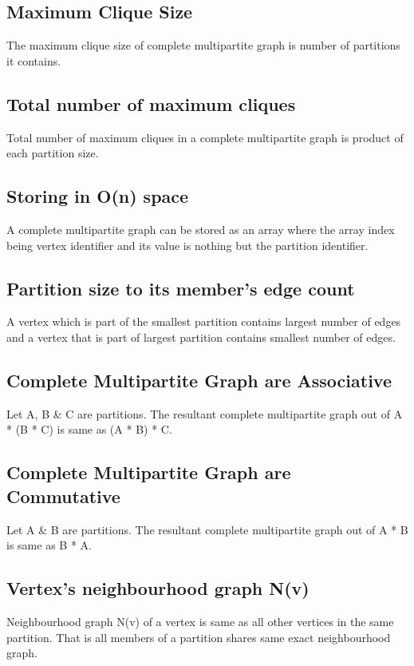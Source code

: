 \documentclass[12pt]{article}
\theoremstyle{plain}
\theoremstyle{definition}
\begin{document}
\subsection{Maximum Clique Size}
The maximum clique size of complete multipartite graph is number of partitions it contains.

\subsection{Total number of maximum cliques}
Total number of maximum cliques in a complete multipartite graph is product of each partition size.

\subsection{Storing in O(n) space}

A complete multipartite graph can be stored as an array where the array index being vertex identifier and its value is nothing but the partition identifier.

\subsection{Partition size to its member's edge count}

A vertex which is part of the smallest partition contains largest number of edges and a vertex that is part of largest partition contains smallest number of edges.


\subsection{Complete Multipartite Graph are Associative}
Let A, B \& C are partitions. The resultant complete multipartite graph out of A * (B * C) is same as (A * B) * C.

\subsection{Complete Multipartite Graph are Commutative}
Let A \& B are partitions. The resultant complete multipartite graph out of A * B is same as B * A.

\subsection{Vertex's neighbourhood graph N(v)}
Neighbourhood graph N(v) of a vertex is same as all other vertices in the same partition. That is all members of a partition shares same exact neighbourhood graph.
\end{document}
